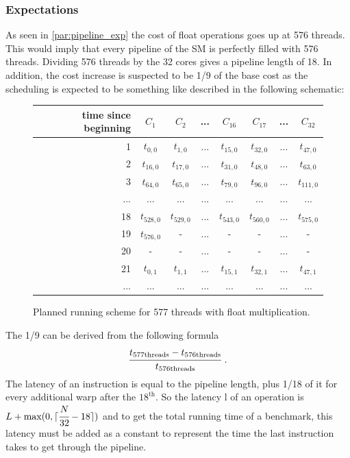 \documentclass{report}
\DeclarePairedDelimiter\ceil{\lceil}{\rceil}
\begin{document}
	\subsubsection{Expectations}
	As seen in \ref{par:pipeline_exp} the cost of float
    operations goes up at 576 threads. This would imply that every pipeline of
    the SM is perfectly filled with 576 threads. Dividing 576 threads by
    the 32 cores gives a pipeline length of 18. In addition, the cost increase
    is suspected to be 1/9 of the base cost as the scheduling is expected to be
    something like described in the following schematic:
    
    \begin{figure}[H]
      \centering
       \begin{tabular}{ | r || c | c | c | c || c | c | c | }
    	    \hline
    	    time since beginning & $C_1$ & $C_2$ & ... & $C_{16}$ & $C_{17}$ & ... & $C_{32}$ \\ \hline  \hline
    	   1 & $t_{0,0}$ & $t_{1,0}$ & ... & $t_{15,0}$ & $t_{32, 0}$ & ... & $t_{47, 0}$ \\ \hline 
    	   2 & $t_{16,0}$ & $t_{17,0}$ & ... & $t_{31,0}$ & $t_{48, 0}$ & ... & $t_{63, 0}$ \\ \hline
    	   3 & $t_{64,0}$ & $t_{65,0}$ & ... & $t_{79,0}$ & $t_{96, 0}$ & ... & $t_{111, 0}$ \\ \hline
    	   ... & ... & ... & ... & ... & ... & ... & ... \\ \hline
    	   18 & $t_{528,0}$ & $t_{529,0}$ & ... & $t_{543,0}$ & $t_{560,0}$ & ... & $t_{575, 0}$ \\ \hline
    	   19 & $t_{576,0}$ & - & ... & - & - & ... & - \\ \hline
    	   20 & - & - & ... & - & - & ... & - \\ \hline
    	   21 & $t_{0,1}$ & $t_{1,1}$ & ... & $t_{15,1}$ & $t_{32,1}$ & ... & $t_{47,1}$ \\ \hline
    	   ... & ... & ... & ... & ... & ... & ... & ... \\ \hline
  	\end{tabular}
  	\captionsetup{justification=centering}
  	\caption{Planned running scheme for 577 threads with float multiplication.}
  	\label{fig:fp_prediction_513}
   \end{figure}

    The 1/9 can be derived from the following formula
    \[ \cfrac{t_{\text{577threads}} - t_{\text{576threads}}}{t_{\text{576threads}}} \text{  .}\]
    The latency of an instruction is equal to the pipeline length, plus 1/18 of
    it for every additional warp after the $18^{\text{th}}$. So the latency l of an 
    operation is $L + \text{max}(0, \ceil{\cfrac{N}{32} -18})$ and to get the total
    running time of a benchmark, this latency must be added as a constant to
    represent the time the last instruction takes to get through the pipeline.
\end{document}
